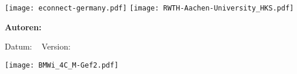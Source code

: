 \begin{titlepage}

\texttt{[image: econnect-germany.pdf]}
\hfill \texttt{[image: RWTH-Aachen-University\_HKS.pdf]}

\vspace{4em}

\begin{huge}
\bfseries\center
\thistitle

\end{huge}

\vspace{4em}

\begin{Large}
\bfseries\noindent Autoren:\\
\thisauthor

\end{Large}

\vspace{4em}

Datum: \thisdate ~ Version: \thisversion

\vspace{4em}

\thisabstract

\vspace{4em}
\hfill \texttt{[image: BMWi\_4C\_M-Gef2.pdf]}


\end{titlepage}
